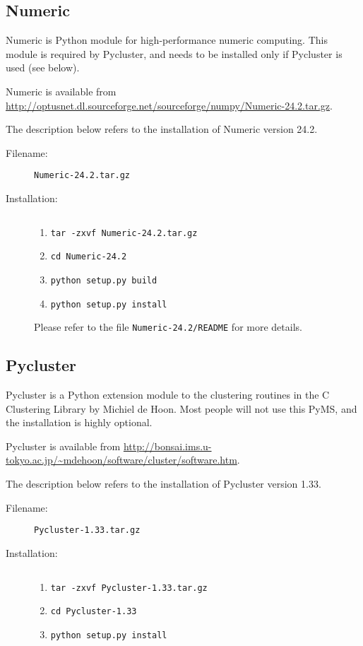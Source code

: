 \subsection{Numeric}

Numeric is Python module for high-performance numeric computing.
This module is required by Pycluster, and needs to be installed
only if Pycluster is used (see below).

Numeric is available from
\url{http://optusnet.dl.sourceforge.net/sourceforge/numpy/Numeric-24.2.tar.gz}.

The description below refers to the installation of Numeric version
24.2.

\begin{description}
\item [Filename:] {\tt Numeric-24.2.tar.gz}
\item [Installation:] $ $
  \begin{enumerate}
  \item {\tt tar -zxvf Numeric-24.2.tar.gz}
  \item {\tt cd Numeric-24.2}
  \item {\tt python setup.py build}
  \item {\tt python setup.py install}
  \end{enumerate}
Please refer to the file {\tt Numeric-24.2/README} for more
details.
\end{description}

\subsection{Pycluster}

Pycluster is a Python extension module to the clustering routines
in the C Clustering Library by Michiel de Hoon.  Most people will
not use this PyMS, and the installation is highly optional. 

Pycluster is available from
\url{http://bonsai.ims.u-tokyo.ac.jp/~mdehoon/software/cluster/software.htm}.

The description below refers to the installation of Pycluster version
1.33.

\begin{description}
\item [Filename:] {\tt Pycluster-1.33.tar.gz}
\item [Installation:] $ $
  \begin{enumerate}
  \item {\tt tar -zxvf Pycluster-1.33.tar.gz}
  \item {\tt cd Pycluster-1.33}
  \item {\tt python setup.py install}
  \end{enumerate}
\end{description}

